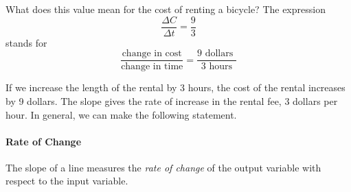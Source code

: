 \documentclass[10pt,]{book}
\theoremstyle{plain}
\theoremstyle{definition}
\theoremstyle{definition}
\numberwithin{equation}{section}
\begin{document}
    What does this value mean for the cost of renting a bicycle? The expression
    \begin{equation*}\frac{\Delta C}{\Delta t}= \frac{9}{3}\end{equation*}
    stands for
    \begin{equation*}\frac{\text{change in cost}}{\text{change in time}}= \frac{9 \text{ dollars }}{3 \text{ hours}}\end{equation*}
%
\par

    If we increase the length of the rental by 3 hours, the cost of the rental increases by 9 dollars. The slope gives the rate of increase in the rental fee, 3 dollars per hour. In general, we can make the following statement.
%
\typeout{************************************************}
\typeout{************************************************}
\paragraph[Rate of Change]{Rate of Change}\label{paragraphs-11}

    The slope of a line measures the \emph{rate of change} of the output variable with respect to the input variable.
%
\par
\end{document}
